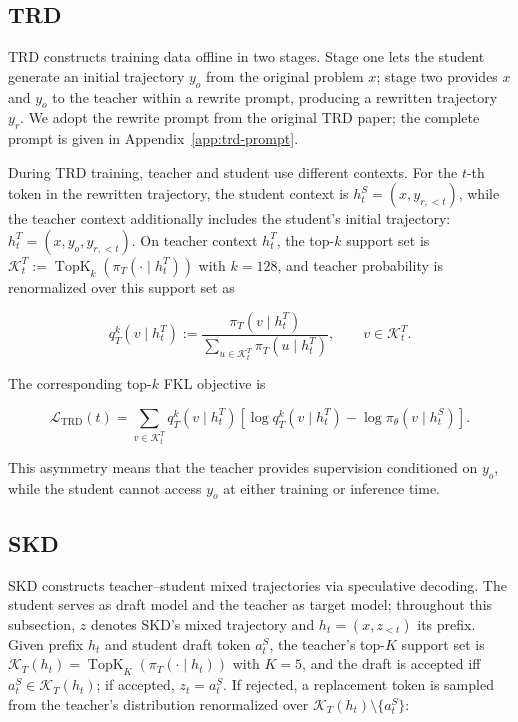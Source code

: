 \documentclass{article} %
\begin{document}


\subsection{TRD}\label{app:trd}

TRD \citep{jiang2026trajectory} constructs training data offline in two stages. Stage one lets the student generate an initial trajectory $y_o$ from the original problem $x$; stage two provides $x$ and $y_o$ to the teacher within a rewrite prompt, producing a rewritten trajectory $y_r$. We adopt the rewrite prompt from the original TRD paper; the complete prompt is given in Appendix~\ref{app:trd-prompt}.\par

During TRD training, teacher and student use different contexts. For the $t$-th token in the rewritten trajectory, the student context is $h_t^S=(x,y_{r,<t})$, while the teacher context additionally includes the student's initial trajectory: $h_t^T=(x,y_o,y_{r,<t})$. On teacher context $h_t^T$, the top-$k$ support set is $\mathcal K_t^T:=\operatorname{TopK}_k\!\left(\pi_T(\cdot\mid h_t^T)\right)$ with $k=128$, and teacher probability is renormalized over this support set as\par

\begin{equation}
q_T^k(v\mid h_t^T)
:=
\frac{\pi_T(v\mid h_t^T)}
{\sum_{u\in\mathcal K_t^T}\pi_T(u\mid h_t^T)},
\qquad v\in\mathcal K_t^T.
\end{equation}

The corresponding top-$k$ FKL objective is\par

\begin{equation}
\mathcal L_{\mathrm{TRD}}(t)
=
\sum_{v\in\mathcal K_t^T}
q_T^k(v\mid h_t^T)
\left[
\log q_T^k(v\mid h_t^T)
-\log\pi_\theta(v\mid h_t^S)
\right].
\end{equation}

This asymmetry means that the teacher provides supervision conditioned on $y_o$, while the student cannot access $y_o$ at either training or inference time.\par

\subsection{SKD}\label{app:skd}

SKD \citep{xu2025speculative} constructs teacher--student mixed trajectories via speculative decoding. The student serves as draft model and the teacher as target model; throughout this subsection, $z$ denotes SKD's mixed trajectory and $h_t=(x,z_{<t})$ its prefix. Given prefix $h_t$ and student draft token $a_t^S$, the teacher's top-$K$ support set is $\mathcal K_T(h_t)=\operatorname{TopK}_K\!\left(\pi_T(\cdot\mid h_t)\right)$ with $K=5$, and the draft is accepted iff $a_t^S\in\mathcal K_T(h_t)$; if accepted, $z_t=a_t^S$. If rejected, a replacement token is sampled from the teacher's distribution renormalized over $\mathcal K_T(h_t)\setminus\{a_t^S\}$:\par
\end{document}
